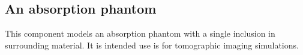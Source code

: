 \subsection*{An absorption phantom}
\label{absorption_sample}
This component models an absorption phantom with a single inclusion in surrounding material. It is intended use
is for tomographic imaging simulations.

 
